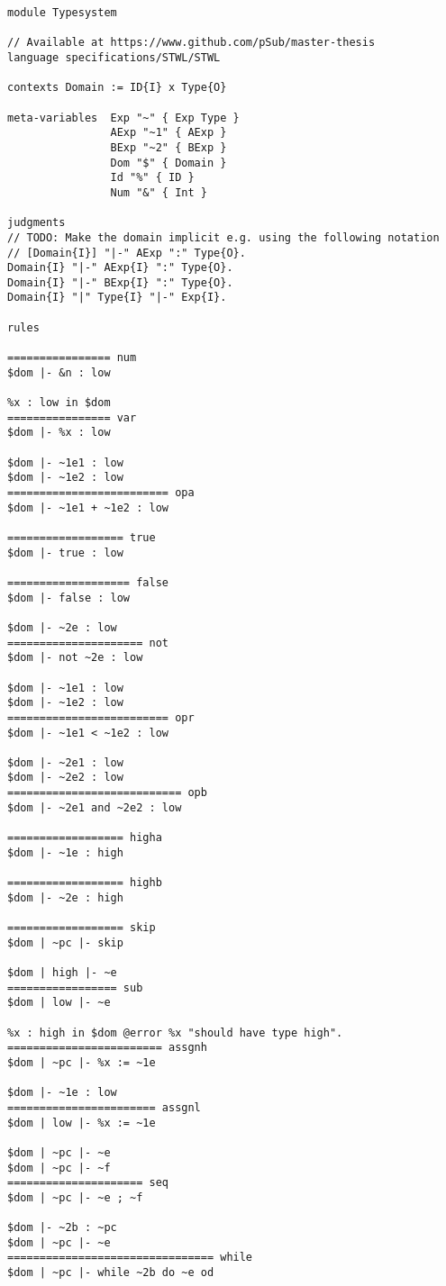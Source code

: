 \begin{lstlisting}[language=sltc]
module Typesystem

// Available at https://www.github.com/pSub/master-thesis
language specifications/STWL/STWL

contexts Domain := ID{I} x Type{O}

meta-variables  Exp "~" { Exp Type }
                AExp "~1" { AExp }
                BExp "~2" { BExp }              
                Dom "$" { Domain }
                Id "%" { ID }
                Num "&" { Int }

judgments
// TODO: Make the domain implicit e.g. using the following notation
// [Domain{I}] "|-" AExp ":" Type{O}.
Domain{I} "|-" AExp{I} ":" Type{O}.
Domain{I} "|-" BExp{I} ":" Type{O}.
Domain{I} "|" Type{I} "|-" Exp{I}.

rules

================ num
$dom |- &n : low

%x : low in $dom
================ var
$dom |- %x : low

$dom |- ~1e1 : low
$dom |- ~1e2 : low
========================= opa
$dom |- ~1e1 + ~1e2 : low

================== true
$dom |- true : low

=================== false
$dom |- false : low

$dom |- ~2e : low
===================== not
$dom |- not ~2e : low

$dom |- ~1e1 : low
$dom |- ~1e2 : low
========================= opr
$dom |- ~1e1 < ~1e2 : low

$dom |- ~2e1 : low
$dom |- ~2e2 : low
=========================== opb
$dom |- ~2e1 and ~2e2 : low

================== higha
$dom |- ~1e : high

================== highb
$dom |- ~2e : high

================== skip
$dom | ~pc |- skip

$dom | high |- ~e
================= sub
$dom | low |- ~e

%x : high in $dom @error %x "should have type high".
======================== assgnh
$dom | ~pc |- %x := ~1e

$dom |- ~1e : low
======================= assgnl
$dom | low |- %x := ~1e

$dom | ~pc |- ~e
$dom | ~pc |- ~f
===================== seq
$dom | ~pc |- ~e ; ~f

$dom |- ~2b : ~pc
$dom | ~pc |- ~e
================================ while
$dom | ~pc |- while ~2b do ~e od


\end{lstlisting}
